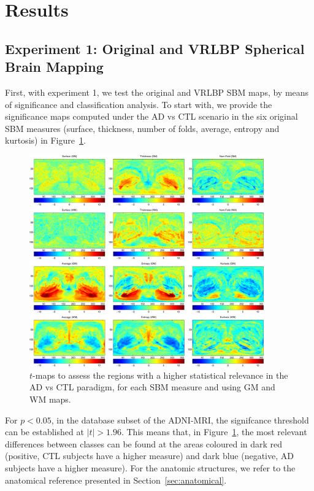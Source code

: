 \section{Results}

\subsection{Experiment 1: Original and VRLBP Spherical Brain Mapping}
First, with experiment 1, we test the original and \ac{VRLBP} \ac{SBM} maps, by means of significance and classification analysis. To start with, we provide the significance maps computed under the \ac{AD} vs \ac{CTL} scenario in the six original \ac{SBM} measures (surface, thickness, number of folds, average, entropy and kurtosis) in  Figure~\ref{fig:tmaps}. 

\begin{figure}[htp]
	\centering
	\includegraphics[width=0.9\textwidth]{Graphics/ch6/07-tmaps}
	\caption[\acs{SBM} t-maps under the \acs{AD} vs \acs{CTL} for \acs{GM} and \acs{WM} images.]{$t$-maps to assess the regions with a higher statistical relevance in the \acs{AD} vs \acs{CTL} paradigm, for each \ac{SBM} measure and using \ac{GM} and \ac{WM} maps. }
	\label{fig:tmaps}
\end{figure}

For $p<0.05$, in the database subset of the ADNI-MRI, the signifcance threshold can be established at $|t|>1.96$. This means that, in Figure~\ref{fig:tmaps}, the most relevant differences between classes can be found at the areas coloured in dark red (positive, \ac{CTL} subjects have a higher measure) and dark blue (negative, \ac{AD} subjects have a higher measure). For the anatomic structures, we refer to the anatomical reference presented in Section~\ref{sec:anatomical}. 

